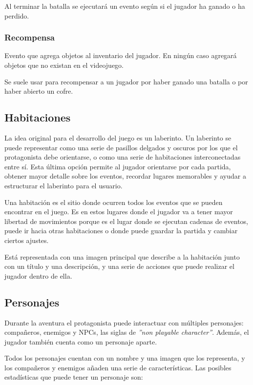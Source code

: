 Al terminar la batalla se ejecutará un evento según si el jugador ha ganado o ha perdido.

\subsubsection{Recompensa}
Evento que agrega objetos al inventario del jugador. En ningún caso agregará objetos que no existan en el videojuego.

Se suele usar para recompensar a un jugador por haber ganado una batalla o por haber abierto un cofre.

\subsection{Habitaciones}
La idea original para el desarrollo del juego es un laberinto. Un laberinto se puede representar como una serie de pasillos delgados y oscuros por los que el protagonista debe orientarse, o como una serie de habitaciones interconectadas entre sí.
Esta última opción permite al jugador orientarse por cada partida, obtener mayor detalle sobre los eventos, recordar lugares memorables y ayudar a estructurar el laberinto para el usuario. 

Una habitación es el sitio donde ocurren todos los eventos que se pueden encontrar en el juego. Es en estos lugares donde el jugador va a tener mayor libertad de movimientos porque es el lugar donde se ejecutan cadenas de eventos, puede ir hacia otras habitaciones o donde puede guardar la partida y cambiar ciertos ajustes.

Está representada con una imagen principal que describe a la habitación junto con un título y una descripción, y una serie de acciones que puede realizar el jugador dentro de ella.

\subsection{Personajes}
Durante la aventura el protagonista puede interactuar con múltiples personajes: compañeros, enemigos y NPCs, las siglas de \textit{''non playable character''}. \cite{npcGeekno} Además, el jugador también cuenta como un personaje aparte.

Todos los personajes cuentan con un nombre y una imagen que los representa, y los compañeros y enemigos añaden una serie de características.
Las posibles estadísticas que puede tener un personaje son:

